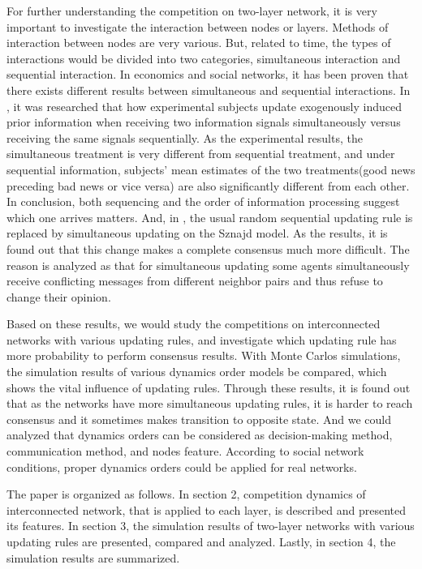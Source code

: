 \documentclass[review]{elsarticle}
\begin{document}
For further understanding the competition on two-layer network, it is very important to investigate the interaction between nodes or layers. Methods of interaction between nodes are very various.\cite{sirbu2017} But, related to time, the types of interactions  would be divided into two categories, simultaneous interaction and sequential interaction. In economics and social networks, it has been proven that there exists different results between simultaneous and sequential interactions.\cite{hoffman2011, dietrich2004} In \cite{hoffman2011}, it was researched that how experimental subjects update exogenously induced prior information when receiving two information signals simultaneously versus receiving the same signals sequentially. As the experimental results, the simultaneous treatment is very different from sequential treatment, and under sequential information,  subjects’ mean estimates of the two treatments(good news preceding bad news or vice versa) are also significantly different from each other. In conclusion, both sequencing and the order of information processing suggest which one arrives matters. 
And, in \cite{dietrich2004}, the usual random sequential updating rule is replaced  by simultaneous updating on the Sznajd model. As the results, it is found out that this change makes a complete consensus much more difficult. The reason is analyzed as that for simultaneous updating some agents simultaneously receive conflicting messages from different neighbor pairs and thus refuse to change their opinion.
     
Based on these results, we would study the competitions on interconnected networks with various updating rules, and investigate which updating rule has more probability to perform consensus results. With Monte Carlos simulations, the simulation results of various dynamics order models be compared, which shows the vital influence of updating rules. Through these results, it is found out that as the networks have more simultaneous updating rules, it is harder to reach consensus and it sometimes makes transition to opposite state. And we could analyzed that dynamics orders can be considered as decision-making method, communication method, and nodes feature. According to social network conditions, proper dynamics orders could be applied for real networks.      

The paper is organized as follows. In section 2, competition dynamics of interconnected network, that is applied to each layer, is described and presented its features. In section 3, the simulation results of two-layer networks with various updating rules are presented, compared and analyzed. Lastly, in section 4, the simulation results are summarized.
\end{document}
